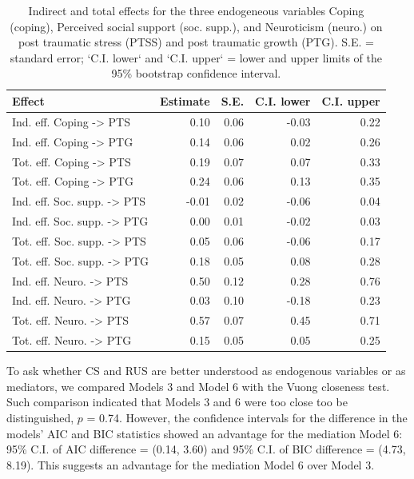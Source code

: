 \documentclass[
  english,
  man,floatsintext]{apa7}
\begin{document}
\begin{table}

\caption{\label{tab:mediation-tab}Indirect and total effects for the three endogeneous variables Coping (coping), Perceived social support (soc. supp.), and Neuroticism (neuro.) on post traumatic stress (PTSS) and post traumatic growth (PTG). S.E. = standard error; `C.I. lower` and `C.I. upper` = lower and upper limits of the 95\% bootstrap confidence interval.}
\centering
\begin{tabular}[t]{lrrrr}
\toprule
Effect & Estimate & S.E. & C.I. lower & C.I. upper\\
\midrule
Ind. eff. Coping -> PTS & 0.10 & 0.06 & -0.03 & 0.22\\
Ind. eff. Coping -> PTG & 0.14 & 0.06 & 0.02 & 0.26\\
Tot. eff. Coping -> PTS & 0.19 & 0.07 & 0.07 & 0.33\\
Tot. eff. Coping -> PTG & 0.24 & 0.06 & 0.13 & 0.35\\
Ind. eff. Soc. supp. -> PTS & -0.01 & 0.02 & -0.06 & 0.04\\
\addlinespace
Ind. eff. Soc. supp. -> PTG & 0.00 & 0.01 & -0.02 & 0.03\\
Tot. eff. Soc. supp. -> PTS & 0.05 & 0.06 & -0.06 & 0.17\\
Tot. eff. Soc. supp. -> PTG & 0.18 & 0.05 & 0.08 & 0.28\\
Ind. eff. Neuro. -> PTS & 0.50 & 0.12 & 0.28 & 0.76\\
Ind. eff. Neuro. -> PTG & 0.03 & 0.10 & -0.18 & 0.23\\
\addlinespace
Tot. eff. Neuro. -> PTS & 0.57 & 0.07 & 0.45 & 0.71\\
Tot. eff. Neuro. -> PTG & 0.15 & 0.05 & 0.05 & 0.25\\
\bottomrule
\end{tabular}
\end{table}

To ask whether CS and RUS are better understood as endogenous variables or as mediators, we compared Models 3 and Model 6 with the Vuong closeness test. Such comparison indicated that Models 3 and 6 were too close too be distinguished, \(p\) = 0.74. However, the confidence intervals for the difference in the models' AIC and BIC statistics showed an advantage for the mediation Model 6: 95\% C.I. of AIC difference = (0.14, 3.60) and 95\% C.I. of BIC difference = (4.73, 8.19). This suggests an advantage for the mediation Model 6 over Model 3.
\end{document}
